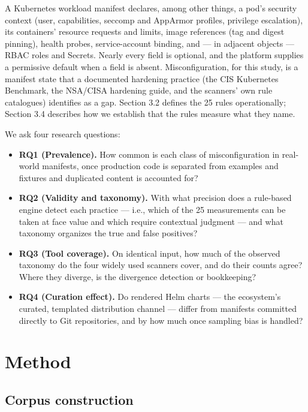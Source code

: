 \documentclass[pdflatex,sn-basic]{sn-jnl}
\providecommand{\tightlist}{\setlength{\itemsep}{0pt}\setlength{\parskip}{0pt}}
\begin{document}
A Kubernetes workload manifest declares, among other things, a pod's
security context (user, capabilities, seccomp and AppArmor profiles,
privilege escalation), its containers' resource requests and limits,
image references (tag and digest pinning), health probes,
service-account binding, and --- in adjacent objects --- RBAC roles and
Secrets. Nearly every field is optional, and the platform supplies a
permissive default when a field is absent. Misconfiguration, for this
study, is a manifest state that a documented hardening practice (the CIS
Kubernetes Benchmark, the NSA/CISA hardening guide, and the scanners'
own rule catalogues) identifies as a gap. Section 3.2 defines the 25
rules operationally; Section 3.4 describes how we establish that the
rules measure what they name.

We ask four research questions:

\begin{itemize}
\tightlist
\item
  \textbf{RQ1 (Prevalence).} How common is each class of
  misconfiguration in real-world manifests, once production code is
  separated from examples and fixtures and duplicated content is
  accounted for?
\item
  \textbf{RQ2 (Validity and taxonomy).} With what precision does a
  rule-based engine detect each practice --- i.e., which of the 25
  measurements can be taken at face value and which require contextual
  judgment --- and what taxonomy organizes the true and false positives?
\item
  \textbf{RQ3 (Tool coverage).} On identical input, how much of the
  observed taxonomy do the four widely used scanners cover, and do their
  counts agree? Where they diverge, is the divergence detection or
  bookkeeping?
\item
  \textbf{RQ4 (Curation effect).} Do rendered Helm charts --- the
  ecosystem's curated, templated distribution channel --- differ from
  manifests committed directly to Git repositories, and by how much once
  sampling bias is handled?
\end{itemize}

\hypertarget{method}{%
\section{Method}\label{method}}

\hypertarget{corpus-construction}{%
\subsection{Corpus construction}\label{corpus-construction}}
\end{document}
